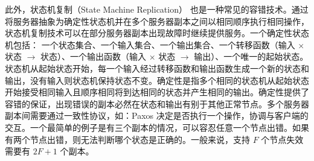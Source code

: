 此外，状态机复制（State Machine Replication） \cite{Lamport:1984:UTI:2993.2994, Schneider:1990:IFS:98163.98167} 也是一种常见的容错技术。通过将服务器抽象为确定性状态机并在多个服务器副本之间以相同顺序执行相同操作，状态机复制技术可以在部分服务器副本出现故障时继续提供服务。一个确定性状态机包括：
一个状态集合、一个输入集合、一个输出集合、一个转移函数（输入 $\times$ 状态 $\rightarrow$ 状态）、一个输出函数（输入 $\times$ 状态 $\rightarrow$ 输出）、一个唯一的起始状态。状态机从起始状态开始，每一个输入经过转移函数和输出函数生成一个新的状态和输出，没有输入则状态机保持状态不变。确定性是指多个相同的状态机从起始状态开始接受相同输入且顺序相同将到达相同的状态并产生相同的输出。确定性提供了容错的保证，出现错误的副本必然在状态和输出有别于其他正常节点。多个服务器副本间需要通过一致性协议，如：Paxos \cite{Lamport:1998:PP:279227.279229} 决定是否执行一个操作，协调与客户端的交互。一个最简单的例子是有三个副本的情况，可以容忍任意一个节点出错。如果有两个节点出错，则无法判断哪个状态是正确的。一般来说，支持 $F$ 个节点失效需要有 $2F + 1$ 个副本。
